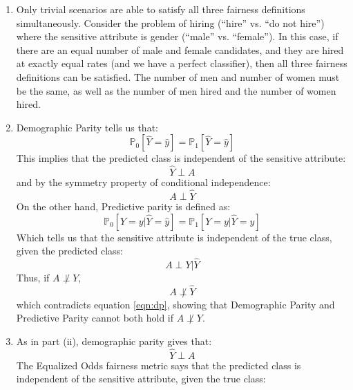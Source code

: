 \documentclass[twoside,11pt]{homework}
\DeclarePairedDelimiter{\2norm}{\lVert}{\rVert^2_2}
\newcommand{\1}[1]{\mathds{1}\left[#1\right]}
\begin{document}
\begin{enumerate}[\bf (i)]
	
	\item Only trivial scenarios are able to satisfy all three fairness definitions simultaneously. Consider the problem of hiring (``hire'' vs. ``do not hire'') where the sensitive attribute is gender (``male'' vs. ``female''). In this case, if there are an equal number of male and female candidates, and they are hired at exactly equal rates (and we have a perfect classifier), then all three fairness definitions can be satisfied. The number of men and number of women must be the same, as well as the number of men hired and the number of women hired.
	
	\item Demographic Parity tells us that:
	\begin{equation}
	\mathbb{P}_0[\hat{Y}=\hat{y}]=\mathbb{P}_1[\hat{Y}=\hat{y}]
	\end{equation}
	This implies that the predicted class is independent of the sensitive attribute:
	\begin{equation}
	\hat{Y}\perp A
	\end{equation}
	and by the symmetry property of conditional independence:
	\begin{equation}
	\label{eqn:dp}
	A \perp \hat{Y}
	\end{equation}
	On the other hand, Predictive parity is defined as:
	\begin{equation}
	\mathbb{P}_0[Y=y|\hat{Y}=\hat{y}]=\mathbb{P}_1[Y=y|\hat{Y}=\hat{y}]
	\end{equation}
	Which tells us that the sensitive attribute is independent of the true class, given the predicted class:
	\begin{equation}
	A \perp Y|\hat{Y}
	\end{equation}
	Thus, if $A \not\perp Y$,
	\begin{equation}
	A \not\perp \hat{Y}
	\end{equation}
	which contradicts equation \ref{eqn:dp}, showing that Demographic Parity and Predictive Parity cannot both hold if $A \not\perp Y$.
	\item As in part (ii), demographic parity gives that:
	\begin{equation}
	\label{eqn:dp2}
	\hat{Y} \perp A
	\end{equation}
	The Equalized Odds fairness metric says that the predicted class is independent of the sensitive attribute, given the true class:
	\begin{equation}

\end{equation}
\end{enumerate}
\end{document}
